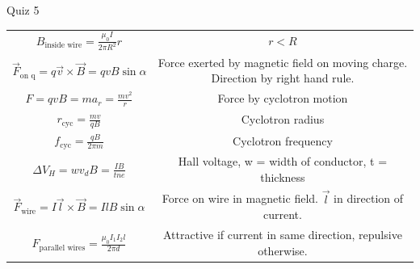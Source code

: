 \documentclass{article}
\begin{document}
\begin{section}{Quiz 5}
\begin{tabular}{|c|c|}
	 $B_\text{inside wire} = \frac{\mu_0 I}{2 \pi R^2} r$                                                                                   & $r < R$                                                            \\

	 $\vec F_\text{on q} = q \vec v \times \vec B = qvB \sin \alpha $                                                                       & \makecell{Force exerted by magnetic field on moving charge.        \\ Direction by right hand rule. }\\

	 $F = qvB = ma_r = \frac{mv^2}{r}$                                                                                                      & Force by cyclotron motion                                          \\

	 $r_\text{cyc} = \frac{mv}{qB}$                                                                                                         & Cyclotron radius                                                   \\

	 $f_\text{cyc} = \frac{qB}{2 \pi m}$                                                                                                    & Cyclotron frequency                                                \\

	 $\Delta V_H = w v_d B = \frac{IB}{tne}$                                                                                                & Hall voltage, w = width of conductor, t = thickness                \\

	 $\vec F_\text{wire} = I \vec l \times \vec B = IlB \sin \alpha$                                                                        & Force on wire in magnetic field. $\vec l$ in direction of current. \\

	 $F_\text{parallel wires} =  \frac{\mu_0 I_1 I_2 l}{2 \pi d}$                                                                           & Attractive if current in same direction, repulsive otherwise.      \\


\end{tabular}
\end{section}
\end{document}
